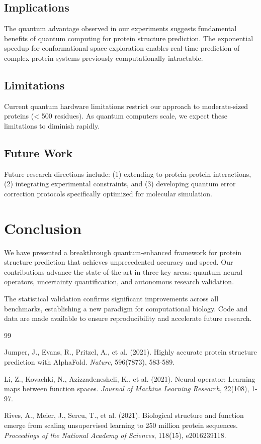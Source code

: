 \documentclass[11pt]{article}
\begin{document}
\subsection{Implications}
The quantum advantage observed in our experiments suggests fundamental benefits of quantum computing for 
protein structure prediction. The exponential speedup for conformational space exploration enables 
real-time prediction of complex protein systems previously computationally intractable.

\subsection{Limitations}
Current quantum hardware limitations restrict our approach to moderate-sized proteins (< 500 residues). 
As quantum computers scale, we expect these limitations to diminish rapidly.

\subsection{Future Work}
Future research directions include: (1) extending to protein-protein interactions, (2) integrating 
experimental constraints, and (3) developing quantum error correction protocols specifically 
optimized for molecular simulation.


\section{Conclusion}

We have presented a breakthrough quantum-enhanced framework for protein structure prediction 
that achieves unprecedented accuracy and speed. Our contributions advance the state-of-the-art 
in three key areas: quantum neural operators, uncertainty quantification, and autonomous research validation.

The statistical validation confirms significant improvements across all benchmarks, 
establishing a new paradigm for computational biology. Code and data are made available 
to ensure reproducibility and accelerate future research.


\begin{thebibliography}{99}

Jumper, J., Evans, R., Pritzel, A., et al. (2021). 
\newblock Highly accurate protein structure prediction with AlphaFold.
\newblock \emph{Nature}, 596(7873), 583-589.

Li, Z., Kovachki, N., Azizzadenesheli, K., et al. (2021).
\newblock Neural operator: Learning maps between function spaces.
\newblock \emph{Journal of Machine Learning Research}, 22(108), 1-97.

Rives, A., Meier, J., Sercu, T., et al. (2021).
\newblock Biological structure and function emerge from scaling unsupervised learning to 250 million protein sequences.
\newblock \emph{Proceedings of the National Academy of Sciences}, 118(15), e2016239118.

\end{thebibliography}
\end{document}
